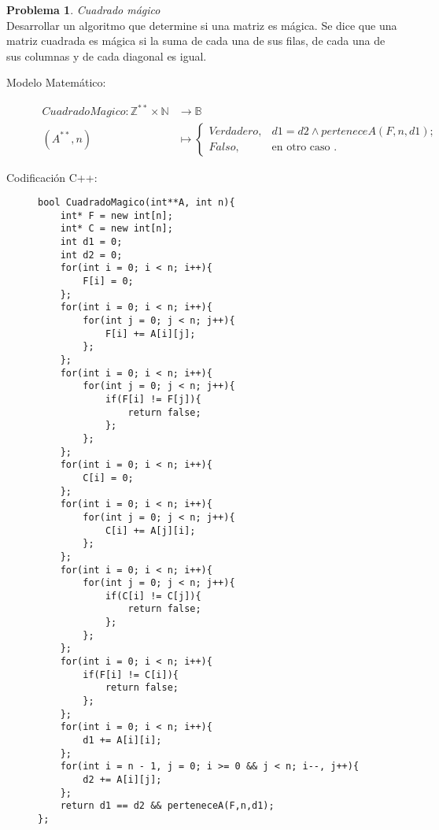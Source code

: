 \documentclass{article}
\theoremstyle{plain}
\theoremstyle{definition}
\newtheorem{problem}{Problema}
\begin{document}
\begin{problem} \emph{Cuadrado mágico}\\
Desarrollar un algoritmo que determine si una matriz es mágica. Se dice que una matriz cuadrada es mágica si la suma de cada una de sus filas, de cada una de sus columnas y de cada diagonal es igual. 
\begin{description}
\item[Modelo Matemático:]
\begin{align*}
CuadradoMagico: \mathbb{Z}^{**}\times\mathbb{N}&\to \mathbb{B}\\
(A^{**},n) &\mapsto 
\begin{cases}
Verdadero, & d1=d2\land perteneceA(F,n,d1);\\
Falso, &\text{en otro caso }. 
\end{cases}
\end{align*}
%
\item[Codificación \textsf{C++}:]\hfill
%
\begin{verbatim}
bool CuadradoMagico(int**A, int n){
    int* F = new int[n];
    int* C = new int[n];
    int d1 = 0;
    int d2 = 0;
    for(int i = 0; i < n; i++){
        F[i] = 0;
    };
    for(int i = 0; i < n; i++){
        for(int j = 0; j < n; j++){
            F[i] += A[i][j];
        };
    };
    for(int i = 0; i < n; i++){
        for(int j = 0; j < n; j++){
            if(F[i] != F[j]){
                return false;
            };
        };
    };
    for(int i = 0; i < n; i++){
        C[i] = 0;
    };
    for(int i = 0; i < n; i++){
        for(int j = 0; j < n; j++){
            C[i] += A[j][i];
        };
    };
    for(int i = 0; i < n; i++){
        for(int j = 0; j < n; j++){
            if(C[i] != C[j]){
                return false;
            };
        };
    };
    for(int i = 0; i < n; i++){
        if(F[i] != C[i]){
            return false;
        };
    };
    for(int i = 0; i < n; i++){
        d1 += A[i][i];
    };
    for(int i = n - 1, j = 0; i >= 0 && j < n; i--, j++){
        d2 += A[i][j];
    };
    return d1 == d2 && perteneceA(F,n,d1);
};
\end{verbatim}
\end{description}
\end{problem}
\end{document}
